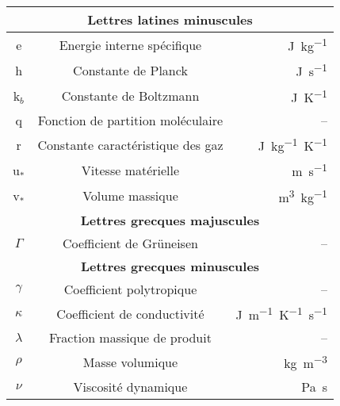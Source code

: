 \begin{center}
\begin{tabular}{ccr}
\midrule 
\multicolumn{3}{c}{\textbf{Lettres latines minuscules}} \\
\midrule

e & Energie interne spécifique & \si{\joule.\kilo\gram^{-1}} \\
h & Constante de Planck & \si{\joule.\second^{-1}} \\
k$_b$ & Constante de Boltzmann & \si{\joule.\kelvin^{-1}} \\
q & Fonction de partition moléculaire & --\\
r & Constante caractéristique des gaz & \si{\joule.\kilo\gram^{-1}\kelvin^{-1}} \\
u$_*$ & Vitesse matérielle & \si{\metre.\second^{-1}} \\
v$_*$ & Volume massique & \si{\metre^{3}.\kilo\gram^{-1}} \\

\midrule 
\multicolumn{3}{c}{\textbf{Lettres grecques majuscules}} \\
\midrule
$\Gamma$ & Coefficient de Grüneisen & --\\

\midrule 
\multicolumn{3}{c}{\textbf{Lettres grecques minuscules}} \\
\midrule
$\gamma$ & Coefficient polytropique & --\\
$\kappa$ & Coefficient de conductivité & \si{\joule.\metre^{-1}.\kelvin^{-1}.\second^{-1}} \\
$\lambda$ & Fraction massique de produit &--\\
$\rho$ & Masse volumique & \si{\kilo\gram.\metre^{-3}}\\
$\nu$ & Viscosité dynamique & \si{\pascal.\second} \\
\bottomrule
\end{tabular}
\end{center}



